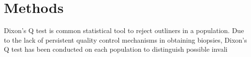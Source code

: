 \chapter{Methods}

Dixon's Q test is common statistical tool to reject outliners in a population. Due to the lack of persistent quality control mechanisms in obtaining biopsies, Dixon's Q test has been conducted on each population to distinguish possible invali